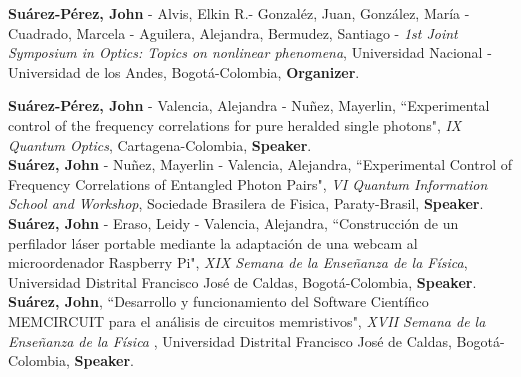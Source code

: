 \documentclass[10pt, a4paper]{article}
\newcommand{\years}[1]{\marginnote{\scriptsize #1}}
\begin{document}
\years{2018}\textbf{Suárez-Pérez, John} - Alvis, Elkin R.- Gonzaléz, Juan, González, María - Cuadrado, Marcela - Aguilera, Alejandra, Bermudez, Santiago - \emph{1st Joint Symposium in Optics: Topics on nonlinear phenomena}, Universidad Nacional - Universidad de los Andes, Bogotá-Colombia, \textbf{Organizer}.\\
\newpage

\years{2018}\textbf{Suárez-Pérez, John} - Valencia, Alejandra - Nuñez, Mayerlin, “Experimental control of the frequency correlations for pure heralded single photons", \emph{IX Quantum Optics}, Cartagena-Colombia, \textbf{Speaker}.\\


\years{2017}\textbf{Suárez, John} - Nuñez, Mayerlin - Valencia, Alejandra, “Experimental Control of Frequency Correlations of Entangled Photon Pairs", \emph{VI Quantum Information School and Workshop}, Sociedade Brasilera de Fisica, Paraty-Brasil, \textbf{Speaker}.\\

\years{2016}\textbf{Suárez, John} - Eraso, Leidy - Valencia, Alejandra, “Construcción de un perfilador láser portable mediante la adaptación de una webcam al microordenador Raspberry Pi", \emph{XIX Semana de la Enseñanza de la Física}, Universidad Distrital Francisco José de Caldas, Bogotá-Colombia, \textbf{Speaker}.\\


\years{2014}\textbf{Suárez, John}, “Desarrollo y funcionamiento del Software Científico MEMCIRCUIT para el análisis de circuitos memristivos", \emph{XVII Semana de la Enseñanza de la Física }, Universidad Distrital Francisco José de Caldas, Bogotá-Colombia, \textbf{Speaker}.\\

\end{document}

